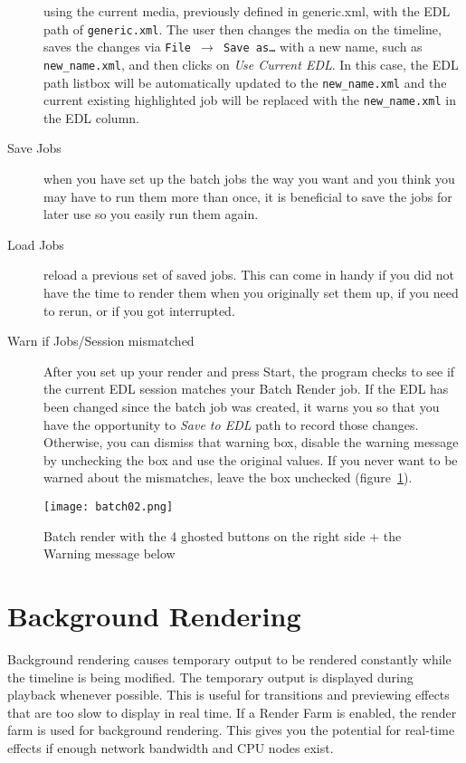 \begin{description}
    using the current media, previously defined in generic.xml, with the EDL path of \texttt{generic.xml}.  The
    user then changes the media on the timeline, saves the changes via \texttt{File $\rightarrow$ Save as\dots} with a new
    name, such as \texttt{new\_name.xml}, and then clicks on \textit{Use Current EDL}.  In this case, the EDL path
    listbox will be automatically updated to the \texttt{new\_name.xml} and the current existing highlighted job will be replaced with the \texttt{new\_name.xml} in the EDL column.
    \item[Save Jobs] when you have set up the batch jobs the way you want and you think you may have to
    run them more than once, it is beneficial to save the jobs for later use so you easily run them again.
    \item[Load Jobs] reload a previous set of saved jobs.  This can come in handy if you did not have the
    time to render them when you originally set them up, if you need to rerun, or if you got interrupted.
    \item[Warn if Jobs/Session mismatched] After you set up your render and press Start, the program checks to see if the current EDL session matches your Batch Render job.  If the EDL has
    been changed since the batch job was created, it warns you so that you have the opportunity to \textit{Save to EDL} path to record those changes.  Otherwise, you can dismiss that warning box, disable the warning message by unchecking the box and use the original values.  If you never want to be warned about the mismatches, leave the box unchecked (figure~\ref{fig:batch02}).
\end{description}

\begin{figure}[htpb]
    \centering
    \texttt{[image: batch02.png]}
    \caption{Batch render with the 4 ghosted buttons on the right side + the Warning message below}
    \label{fig:batch02}
\end{figure}

\section{Background Rendering}%
\label{sec:background_rendering}

Background rendering causes temporary output to be rendered constantly while the timeline is being modified. The temporary output is displayed during playback whenever possible. This is useful for transitions and previewing effects that are too slow to display in real time. If a Render Farm is enabled, the render farm is used for background rendering. This gives you the potential for real-time effects if enough network bandwidth and CPU nodes exist.

